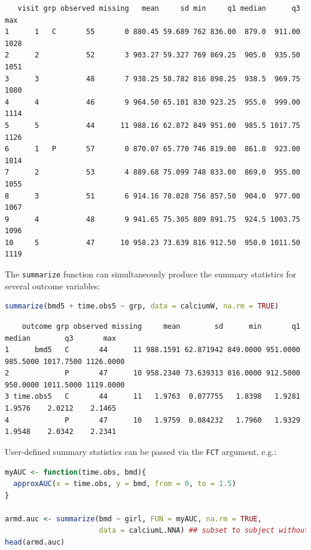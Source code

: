 \documentclass[12pt]{article}
\begin{document}
\label{}
\begin{verbatim}
   visit grp observed missing   mean     sd min     q1 median      q3  max
1      1   C       55       0 880.45 59.689 762 836.00  879.0  911.00 1028
2      2           52       3 903.27 59.327 769 869.25  905.0  935.50 1051
3      3           48       7 938.25 58.782 816 898.25  938.5  969.75 1080
4      4           46       9 964.50 65.101 830 923.25  955.0  999.00 1114
5      5           44      11 988.16 62.872 849 951.00  985.5 1017.75 1126
6      1   P       57       0 870.07 65.770 746 819.00  861.0  923.00 1014
7      2           53       4 889.68 75.099 748 833.00  869.0  955.00 1055
8      3           51       6 914.16 78.028 756 857.50  904.0  977.00 1067
9      4           48       9 941.65 75.305 809 891.75  924.5 1003.75 1096
10     5           47      10 958.23 73.639 816 912.50  950.0 1011.50 1119
\end{verbatim}

\noindent The \texttt{summarize} function can simultaneously produce the summary
statistics for several outcome variables:
\begin{lstlisting}[language=r,numbers=none]
summarize(bmd5 + time.obs5 ~ grp, data = calciumW, na.rm = TRUE)
\end{lstlisting}

\label{}
\begin{verbatim}
    outcome grp observed missing     mean        sd      min       q1   median        q3       max
1      bmd5   C       44      11 988.1591 62.871942 849.0000 951.0000 985.5000 1017.7500 1126.0000
2             P       47      10 958.2340 73.639313 816.0000 912.5000 950.0000 1011.5000 1119.0000
3 time.obs5   C       44      11   1.9763  0.077755   1.8398   1.9281   1.9576    2.0212    2.1465
4             P       47      10   1.9759  0.084232   1.7960   1.9329   1.9548    2.0342    2.2341
\end{verbatim}


\noindent User-defined summary statistics can be passed via the \texttt{FCT} argument, e.g.:
\begin{lstlisting}[language=r,numbers=none]
myAUC <- function(time.obs, bmd){
  approxAUC(x = time.obs, y = bmd, from = 0, to = 1.5)
}

armd.auc <- summarize(bmd ~ girl, FUN = myAUC, na.rm = TRUE,
                      data = calciumL.NNA) ## subset to subject without missing value.
head(armd.auc)
\end{lstlisting}
\end{document}

